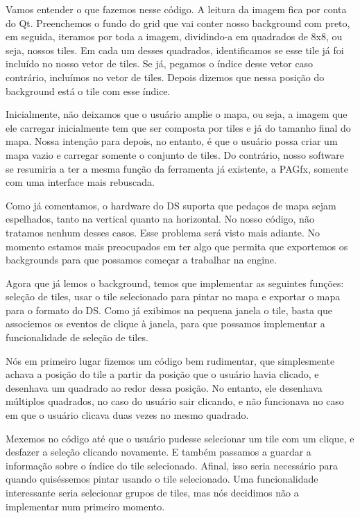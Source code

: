\documentclass[brazil]{abnt}
\begin{document}
Vamos entender o que fazemos nesse código. A leitura da imagem fica por conta do Qt. Preenchemos o fundo do grid que vai conter nosso background com preto, em seguida, iteramos por toda a imagem, dividindo-a em quadrados de 8x8, ou seja, nossos tiles. Em cada um desses quadrados, identificamos se esse tile já foi incluído no nosso vetor de tiles. Se já, pegamos o índice desse vetor caso contrário, incluímos no vetor de tiles. Depois dizemos que nessa posição do background está o tile com esse índice. 

Inicialmente, não deixamos que o usuário amplie o mapa, ou seja, a imagem que ele carregar inicialmente tem que ser composta por tiles e já do tamanho final do mapa. Nossa intenção para depois, no entanto, é que o usuário possa criar um mapa vazio e carregar somente o conjunto de tiles. Do contrário, nosso software se resumiria a ter a mesma função da ferramenta já existente, a PAGfx, somente com uma interface mais rebuscada.

Como já comentamos, o hardware do DS suporta que pedaços de mapa sejam espelhados, tanto na vertical quanto na horizontal. No nosso código, não tratamos nenhum desses casos. Esse problema será visto mais adiante. No momento estamos mais preocupados em ter algo que permita que exportemos os backgrounds para que possamos começar a trabalhar na engine.

Agora que já lemos o background, temos que implementar as seguintes funções: seleção de tiles, usar o tile selecionado para pintar no mapa e exportar o mapa para o formato do DS. Como já exibimos na pequena janela o tile, basta que associemos os eventos de clique à janela, para que possamos implementar a funcionalidade de seleção de tiles.

Nós em primeiro lugar fizemos um código bem rudimentar, que simplesmente achava a posição do tile a partir da posição que o usuário havia clicado, e desenhava um quadrado ao redor dessa posição. No entanto, ele desenhava múltiplos quadrados, no caso do usuário sair clicando, e não funcionava no caso em que o usuário clicava duas vezes no mesmo quadrado.

Mexemos no código até que o usuário pudesse selecionar um tile com um clique, e desfazer a seleção clicando novamente. E também passamos a guardar a informação sobre o índice do tile selecionado. Afinal, isso seria necessário para quando quiséssemos pintar usando o tile selecionado. Uma funcionalidade interessante seria selecionar grupos de tiles, mas nós decidimos não a implementar num primeiro momento.
\end{document}
